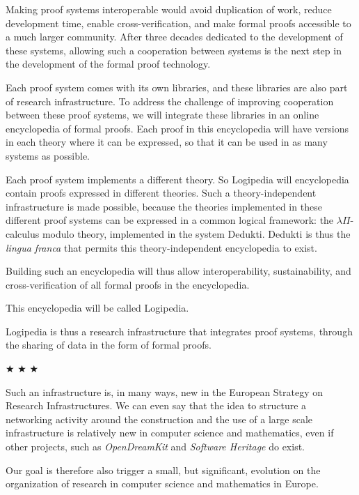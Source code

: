 Making proof systems interoperable would avoid duplication of work,
reduce development time, enable cross-verification, and make formal
proofs accessible to a much larger community.  After three decades
dedicated to the development of these systems, allowing such a
cooperation between systems is the next step in the development of the
formal proof technology.

Each proof system comes with its own libraries, and these libraries
are also part of research infrastructure.  To address the challenge of
improving cooperation between these proof systems, we will integrate
these libraries in an online encyclopedia of formal proofs. Each proof
in this encyclopedia will have versions in each theory where it can be
expressed, so that it can be used in as many systems as possible.

Each proof system implements a different theory. So Logipedia will
encyclopedia contain proofs expressed in different theories.  Such a
theory-independent infrastructure is made possible, because the
theories implemented in these different proof systems can be expressed
in a common logical framework: the $\lambda \Pi$-calculus modulo
theory, implemented in the system Dedukti.  Dedukti is thus the {\em
lingua franca} that permits this theory-independent encyclopedia to 
exist.

Building such an encyclopedia will thus allow interoperability,
sustainability, and cross-verification of all formal proofs in the
encyclopedia.

This encyclopedia will be called Logipedia.

Logipedia is thus a research infrastructure that integrates proof
systems, through the sharing of data in the form of formal proofs.

\begin{center}
  
$\bigstar$ $\bigstar$ $\bigstar$

\end{center}

Such an infrastructure is, in many ways, new in the European Strategy
on Research Infrastructures. We can even say that the idea to
structure a networking activity around the construction and the use of
a large scale infrastructure is relatively new in computer science and
mathematics, even if other projects, such as {\em OpenDreamKit} and
{\em Software Heritage} do exist.

Our goal is therefore also trigger a
small, but significant, evolution on the organization of research in
computer science and mathematics in Europe.

